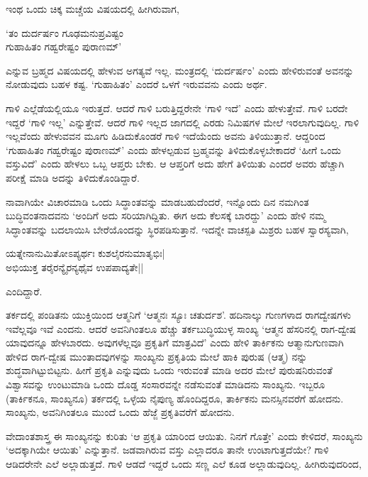 ಇಂಥ ಒಂದು ಚಿಕ್ಕ ಮಚ್ಚೆಯ ವಿಷಯದಲ್ಲಿ ಹೀಗಿರುವಾಗ,

\begin{shloka}
`ತಂ ದುರ್ದರ್ಷಂ ಗೂಢಮನುಪ್ರವಿಷ್ಟಂ\\
ಗುಹಾಹಿತಂ ಗಹ್ವರೇಷ್ಟಂ ಪುರಾಣಮ್'
\end{shloka}

ಎನ್ನುವ ಬ್ರಹ್ಮದ ವಿಷಯದಲ್ಲಿ ಹೇಳುವ ಅಗತ್ಯವೆ ಇಲ್ಲ. ಮಂತ್ರದಲ್ಲಿ `ದುರ್ದರ್ಷಂ' ಎಂದು ಹೇಳಿರುವಂತೆ ಅವನನ್ನು ನೋಡುವುದು ಬಹಳ ಕಷ್ಟ. `ಗುಹಾಹಿತಂ' ಎಂದರೆ ಒಳಗೆ ಇರುವವನು ಎಂದು ಅರ್ಥ.

ಗಾಳಿ ಎಲ್ಲೆಡೆಯಲ್ಲಿಯೂ ಇರುತ್ತದೆ. ಆದರೆ ಗಾಳಿ ಬರುತ್ತಿದ್ದರೇನೇ `ಗಾಳಿ ಇದೆ' ಎಂದು ಹೇಳುತ್ತೇವೆ. ಗಾಳಿ ಬರದೇ ಇದ್ದರೆ `ಗಾಳಿ ಇಲ್ಲ' ಎನ್ನುತ್ತೇವೆ. ಆದರೆ ಗಾಳಿ ಇಲ್ಲದ ಜಾಗದಲ್ಲಿ ಎರಡು ನಿಮಿಷಗಳ ಮೇಲೆ ಇರಲಾಗುವುದಿಲ್ಲ. ಗಾಳಿ ಇಲ್ಲವೆಂದು ಹೇಳುವವನ ಮೂಗು ಹಿಡಿದುಕೊಂಡರೆ ಗಾಳಿ ಇದೆಯೆಂದು ಅವನು ತಿಳಿಯುತ್ತಾನೆ. ಆದ್ದರಿಂದ `ಗುಹಾಹಿತಂ ಗಹ್ವರೇಷ್ಟಂ ಪುರಾಣಮ್' ಎಂದು ಹೇಳಲ್ಪಡುವ ಬ್ರಹ್ಮವನ್ನು ತಿಳಿದುಕೊಳ್ಳಬೇಕಾದರೆ `ಹೀಗೆ ಒಂದು ವಸ್ತುವಿದೆ' ಎಂದು ಹೇಳಲು ಒಬ್ಬ ಆಪ್ತರು ಬೇಕು. ಆ ಆಪ್ತರಿಗೆ ಅದು ಹೇಗೆ ತಿಳಿಯಿತು ಎಂದರೆ ಅವರು ಹೆಚ್ಚಾಗಿ ಪರೀಕ್ಷೆ ಮಾಡಿ ಅದನ್ನು ತಿಳಿದುಕೊಂಡಿದ್ದಾರೆ.

ನಾವಾಗಿಯೇ ವಿಚಾರಮಾಡಿ ಒಂದು ಸಿದ್ಧಾಂತವನ್ನು ಮಾಡಬಹುದೆಂದರೆ, ಇನ್ನೊಂದು ದಿನ ನಮಗಿಂತ ಬುದ್ಧಿವಂತನಾದವನು `ಅಂದಿಗೆ ಅದು ಸರಿಯಾಗಿದ್ದಿತು. ಈಗ ಅದು ಕೆಲಸಕ್ಕೆ ಬಾರದ್ದು' ಎಂದು ಹೇಳಿ ನಮ್ಮ ಸಿದ್ಧಾಂತವನ್ನು ಬದಲಾಯಿಸಿ ಬೇರೆಯೊಂದನ್ನು ಸ್ಥಿರಪಡಿಸುತ್ತಾನೆ. ಇದನ್ನೇ ವಾಚಸ್ಪತಿ ಮಿಶ್ರರು ಬಹಳ ಸ್ವಾರಸ್ಯವಾಗಿ,

\begin{shloka}
ಯತ್ನೇನಾನುಮಿತೋಽಪ್ಯರ್ಥಃ ಕುಶಲೈರನುಮಾತೃಭಿಃ|\\
ಅಭಿಯುಕ್ತ ತರೈರನ್ಯೈರನ್ಯಥೈವ ಉಪಪಾದ್ಯತೇ||
\end{shloka}

ಎಂದಿದ್ದಾರೆ.

ತರ್ಕದಲ್ಲಿ ಪಂಡಿತನು ಯುಕ್ತಿಯಿಂದ ಆತ್ಮನಿಗೆ `ಆತ್ಮನಃ ಸ್ಯೂಃ ಚತುರ್ದಶ'. ಹದಿನಾಲ್ಕು ಗುಣಗಳಾದ ರಾಗದ್ವೇಷಗಳು ಇವೆಲ್ಲವೂ ಇವೆ ಎಂದನು. ಆದರೆ ಅವನಿಗಿಂತಲೂ ಹೆಚ್ಚು ತರ್ಕಬುದ್ಧಿಯುಳ್ಳ ಸಾಂಖ್ಯ `ಆತ್ಮನ ಹೆಸರಿನಲ್ಲಿ ರಾಗ-ದ್ವೇಷ ಯಾವುದನ್ನೂ ಹೇಳಬಾರದು. ಅವುಗಳೆಲ್ಲವೂ ಪ್ರಕೃತಿಗೆ ಮಾತ್ರವಿದೆ' ಎಂದು ಹೇಳಿ ತಾರ್ಕಿಕನು ಆತ್ಮಾನುಗುಣವಾಗಿ ಹೇಳಿದ ರಾಗ-ದ್ವೇಷ ಮುಂತಾದವುಗಳನ್ನು ಸಾಂಖ್ಯನು ಪ್ರಕೃತಿಯ ಮೇಲೆ ಹಾಕಿ ಪುರುಷ (ಆತ್ಮ) ನನ್ನು ಶುದ್ಧವಾಗಿಟ್ಟುಬಿಟ್ಟನು. ಹೀಗೆ ಪ್ರಕೃತಿ ಎನ್ನುವುದು ಒಂದು ಇರುವಂತೆ ಮಾಡಿ ಅದರ ಮೇಲೆ ಪುರುಷನಿರುವಂತೆ ವಿಶ್ವಾಸವನ್ನು ಉಂಟುಮಾಡಿ ಒಂದು ದೊಡ್ಡ ಸಂಸಾರವನ್ನೇ ನಡೆಸುವಂತೆ ಮಾಡಿದನು ಸಾಂಖ್ಯನು. ಇಬ್ಬರೂ (ತಾರ್ಕಿಕನೂ, ಸಾಂಖ್ಯನೂ) ತರ್ಕದಲ್ಲಿ ಒಳ್ಳೆಯ ನೈಪುಣ್ಯ ಹೊಂದಿದ್ದರೂ, ತಾರ್ಕಿಕನು ಮನಸ್ಸಿನವರೆಗೆ ಹೋದನು. ಸಾಂಖ್ಯನು, ಅವನಿಗಿಂತಲೂ ಮುಂದೆ ಒಂದು ಹೆಜ್ಜೆ ಪ್ರಕೃತಿವರೆಗೆ ಹೋದನು.

ವೇದಾಂತಶಾಸ್ತ್ರ ಈ ಸಾಂಖ್ಯನನ್ನು ಕುರಿತು `ಆ ಪ್ರಕೃತಿ ಯಾರಿಂದ ಆಯಿತು. ನಿನಗೆ ಗೊತ್ತೇ' ಎಂದು ಕೇಳಿದರೆ, ಸಾಂಖ್ಯನು `ಅದಕ್ಕಾಗಿಯೇ ಆಯಿತು' ಎನ್ನುತ್ತಾನೆ. ಜಡವಾಗಿರುವ ವಸ್ತು ಎಲ್ಲಾದರೂ ತಾನೇ ಉಂಟಾಗುತ್ತದೆಯೇ? ಗಾಳಿ ಆಡಿದರೇನೇ ಎಲೆ ಅಲ್ಲಾಡುತ್ತದೆ. ಗಾಳಿ ಆಡದೆ ಇದ್ದರೆ ಒಂದು ಸಣ್ಣ ಎಲೆ ಕೂಡ ಅಲ್ಲಾಡುವುದಿಲ್ಲ. ಹೀಗಿರುವುದರಿಂದ,

